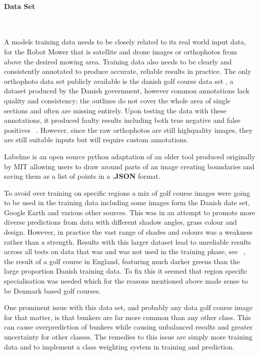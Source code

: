 \documentclass[final]{cmpreport_02}
\begin{document}
\paragraph{Data Set} \

A models training data needs to be closely related to its real world input data, for the Robot Mower that is satellite and drone images or orthophotos from above the desired mowing area.
Training data also needs to be clearly and consistently annotated to produce accurate, reliable results in practice.
The only orthophoto data set publicly available is the danish golf course data set \citep{danishgolf}, a dataset produced by the Danish government, however common annotations lack quality and consistency; the outlines do not cover the whole area of single sections and often are missing entirely.
Upon testing the data with these annotations, it produced faulty results including both true negative and false positives ~.
However, since the raw orthophotos are still highquality images, they are still suitable inputs but will require custom annotations.

Labelme \citep{labelme} is an open source python adaptation of an older tool produced originally by MIT allowing users to draw around parts of an image creating boundaries and saving them as a list of points in a \textbf{.JSON} format.

To avoid over training on specific regions a mix of golf course images were going to be used in the training data including some images form the Danish date set, Google Earth and various other sources.
This was in an attempt to promote more diverse predictions from data with different shadow angles, grass colour and design.
However, in practice the vast range of shades and colours was a weakness rather than a strength.
Results with this larger dataset lead to unreliable results across all tests on data that was and was not used in the training phase, see ~, the result of a golf course in England, featuring much darker greens than the large proportion Danish training data.
To fix this it seemed that region specific specialisation was needed which for the reasons mentioned above made sense to be Denmark based golf courses.

One prominent issue with this data set, and probably any data golf course image for that matter, is that bunkers are far more common than any other class.
This can cause overprediction of bunkers while causing unbalanced results and greater uncertainty for other classes.
The remedies to this issue are simply more training data and to implement a class weighting system in training and prediction.
\end{document}
